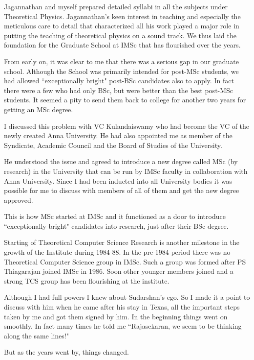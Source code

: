 Jagannathan and myself prepared detailed syllabi in all the subjects 
under Theoretical Physics. Jagannathan's keen inte\-rest in teaching and 
especially the meticulous care to detail that characterized all his work 
played a major role in putting the teaching of theoretical physics on a 
sound track. We thus laid the foundation for the Graduate School at IMSc 
that has flouri\-shed over the years.


From early on, it was clear to me that there was a serious gap in our 
graduate school. Although the School was primarily intended for post-MSc 
students, we had allowed ``exceptionally bright" post-BSc candidates also 
to apply. In fact there were a few who had only BSc, but were better than 
the best post-MSc students. It seemed a pity to send them back to 
college for ano\-ther two years for getting an MSc degree.


I discussed this problem with VC Kulandaiswamy who had become the VC of 
the newly created Anna University. He had also appointed me as member of 
the Syndicate, Academic Council and the Board of Studies of the 
University.


He understood the issue and agreed to introduce a new degree called MSc 
(by research) in the University that can be run by IMSc faculty in 
collaboration with Anna University. Since I had been inducted into all 
University bodies it was possible for me to discuss with members of all 
of them and get the new degree approved.


This is how MSc started at IMSc and it functioned as a door to introduce 
``exceptionally bright" candidates into research, just after their BSc 
degree.


Starting of Theoretical Computer Science Research is ano\-ther milestone 
in the growth of the Institute during 1984-88. In the pre-1984 period 
there was no Theoretical Computer Science group in IMSc. Such a group 
was formed after PS Thiagarajan joined IMSc in 1986. Soon other younger 
members joined and a strong TCS group has been flourishing at the 
institute.


Although I had full powers I knew about Sudarshan's ego. So I made it a 
point to discuss with him when he came after his stay in Texas, all the 
important steps taken by me and got them signed by him. In the beginning 
things went on smoothly. In fact many times he told me ``Rajasekaran, we 
seem to be thinking along the same lines!"
 
But as the years went by, things changed.


